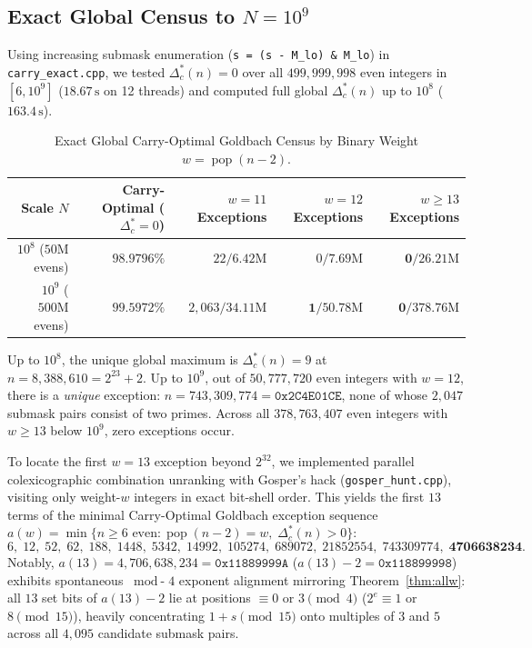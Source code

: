 \documentclass[11pt,a4paper]{article}
\begin{document}
\subsection{Exact Global Census to $N = 10^9$}
Using increasing submask enumeration (\texttt{s = (s - M\_lo) \& M\_lo}) in \texttt{carry\_exact.cpp}, we tested $\Delta_c^*(n) = 0$ over all $499{,}999{,}998$ even integers in $[6, 10^9]$ ($18.67\,\text{s}$ on 12 threads) and computed full global $\Delta_c^*(n)$ up to $10^8$ ($163.4\,\text{s}$).

\begin{table}[h]
\centering
\caption{Exact Global Carry-Optimal Goldbach Census by Binary Weight $w = \operatorname{pop}(n - 2)$.}
\begin{tabular}{rrrrr}
\toprule
Scale $N$ & Carry-Optimal ($\Delta_c^* = 0$) & $w = 11$ Exceptions & $w = 12$ Exceptions & $w \ge 13$ Exceptions \\
\midrule
$10^8$ ($50\text{M}$ evens) & $98.9796\%$ & $22 / 6.42\text{M}$ & $0 / 7.69\text{M}$ & $\mathbf{0} / 26.21\text{M}$ \\
$10^9$ ($500\text{M}$ evens) & $\mathbf{99.5972\%}$ & $2{,}063 / 34.11\text{M}$ & $\mathbf{1} / 50.78\text{M}$ & $\mathbf{0} / 378.76\text{M}$ \\
\bottomrule
\end{tabular}
\end{table}

Up to $10^8$, the unique global maximum is $\Delta_c^*(n) = 9$ at $n = 8{,}388{,}610 = 2^{23} + 2$. Up to $10^9$, out of $50{,}777{,}720$ even integers with $w = 12$, there is a \emph{unique} exception: $n = 743{,}309{,}774 = \texttt{0x2C4E01CE}$, none of whose $2{,}047$ submask pairs consist of two primes. Across all $378{,}763{,}407$ even integers with $w \ge 13$ below $10^9$, zero exceptions occur.

To locate the first $w = 13$ exception beyond $2^{32}$, we implemented parallel colexicographic combination unranking with Gosper's hack (\texttt{gosper\_hunt.cpp}), visiting only weight-$w$ integers in exact bit-shell order. This yields the first $13$ terms of the minimal Carry-Optimal Goldbach exception sequence $a(w) = \min\{n \ge 6 \text{ even} : \operatorname{pop}(n - 2) = w,\; \Delta_c^*(n) > 0\}$:
\[
6,\; 12,\; 52,\; 62,\; 188,\; 1448,\; 5342,\; 14992,\; 105274,\; 689072,\; 21852554,\; 743309774,\; \mathbf{4706638234}.
\]
Notably, $a(13) = 4{,}706{,}638{,}234 = \texttt{0x11889999A}$ ($a(13) - 2 = \texttt{0x118899998}$) exhibits spontaneous $\bmod\text{-}4$ exponent alignment mirroring Theorem~\ref{thm:allw}: all $13$ set bits of $a(13) - 2$ lie at positions $\equiv 0$ or $3 \pmod 4$ ($2^e \equiv 1$ or $8 \pmod{15}$), heavily concentrating $1 + s \pmod{15}$ onto multiples of $3$ and $5$ across all $4{,}095$ candidate submask pairs.
\end{document}
